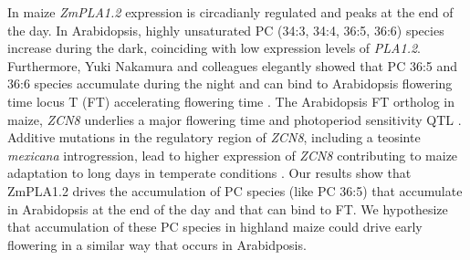 \documentclass[9pt,twocolumn,twoside,lineno]{BioRxiv}
\begin{document}
In maize \textit{ZmPLA1.2} expression is circadianly regulated\cite{Khan2010-iv} and peaks at the end of the day. 
In Arabidopsis, highly unsaturated PC (34:3, 34:4, 36:5, 36:6) species increase during the dark\cite{Maatta2012-ip}, coinciding with low expression levels of \textit{PLA1.2}\cite{Khan2010-iv}.
Furthermore, Yuki Nakamura and colleagues elegantly showed that PC 36:5 and 36:6 species accumulate during the night and can bind to Arabidopsis flowering time locus T (FT) accelerating flowering time \cite{Nakamura2014-qf}. 
The Arabidopsis FT ortholog in maize, \textit{ZCN8} \cite{Lazakis2011-nq} underlies a major flowering time and photoperiod sensitivity QTL \cite{Hung2012-ms}.
Additive mutations in the regulatory region of \textit{ZCN8}, including a teosinte \textit{mexicana} introgression, lead to higher expression of \textit{ZCN8} contributing to maize adaptation to long days in temperate conditions \cite{Guo2019-pn}.
Our results show that ZmPLA1.2 drives the accumulation of PC species (like PC 36:5) that accumulate in Arabidopsis at the end of the day and that can bind to FT. 
We hypothesize that accumulation of these PC species in highland maize could drive early flowering in a similar way that occurs in Arabidposis. 
\end{document}
